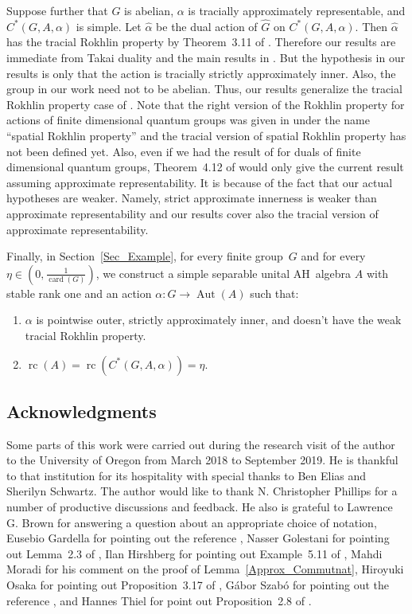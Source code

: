 \documentclass[10pt]{amsart}
\numberwithin{equation}{section}
\theoremstyle{definition}
\newcommand{\card}{{\operatorname{card}}}
\newcommand{\Aut}{{\operatorname{Aut}}}
\newcommand{\rc}{{\operatorname{rc}}}
\begin{document}
Suppose further that $G$ is abelian, $\alpha$ is tracially approximately representable, and $C^*(G, A, \alpha)$ is simple. 
Let $\widehat{\alpha}$ be the dual action of $\widehat{G}$ on $C^*(G, A, \alpha)$. 
Then $\widehat{\alpha}$  has the tracial Rokhlin property by Theorem~3.11 of \cite{Ph11}. Therefore our results are immediate from 
Takai duality \cite{Tak75} and the main results in \cite{AGP19}.
But the hypothesis in our results is only that the action is tracially
strictly approximately inner.  
Also, the group in our work need not to be abelian. 
Thus, our results generalize the tracial Rokhlin property case
of \cite{AGP19}.
Note that the right version of the Rokhlin property for
actions of finite dimensional quantum groups was given in \cite{GKL19}
under the name ``spatial Rokhlin property''
and the tracial version of spatial Rokhlin property has not been defined yet. 
Also, even if we had the result of \cite{AGP19} for duals of finite dimensional quantum groups,
Theorem~4.12 of \cite{BSV17} would only give the current result assuming approximate representability.
 It is because of the fact that our actual hypotheses are weaker.
 Namely, strict approximate innerness is weaker than approximate representability and 
 our results cover also the tracial version of approximate representability.

Finally, in Section~\ref{Sec_Example}, for every finite group~$G$ and for every  $\eta \in \left(0, \frac{1}{\card (G)}\right)$, 
we construct a simple separable unital AH~algebra $A$ with stable rank one 
and an action $\alpha \colon G \to \Aut (A)$  such that:
\begin{enumerate}
\item
$\alpha$ is pointwise outer, strictly approximately  inner, and doesn't have the weak tracial Rokhlin property.
\item 
$\rc (A) =\rc \left(C^*(G, A, \alpha)\right)= \eta$.
\end{enumerate}
\subsection*{Acknowledgments}
Some parts of
this work were carried out during the research visit of the author to the University of Oregon 
from March 2018 to September 2019.
He is thankful to that institution for its hospitality with special thanks to Ben Elias and Sherilyn Schwartz.
The author would like to thank N. Christopher Phillips
for a number of  productive discussions and feedback. 
He also is grateful to Lawrence G. Brown for answering a question about an appropriate choice of notation,
Eusebio Gardella for pointing out the reference \cite{GKL19},
Nasser Golestani for pointing out Lemma~2.3 of \cite{HO13},
 Ilan Hirshberg for pointing out Example~5.11 of \cite{Iz1},
 Mahdi Moradi for his comment on the proof of Lemma~\ref{Approx_Commutnat}, 
Hiroyuki  Osaka for pointing out Proposition~3.17 of \cite{LO19}, Gábor Szabó for pointing out the reference \cite{BSV17},
and Hannes Thiel for point out Proposition~2.8 of \cite{Th20}.
\end{document}
